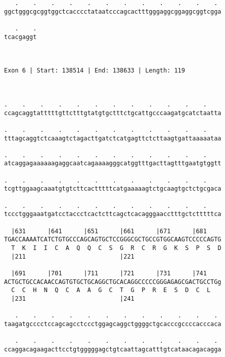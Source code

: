 \documentclass{article}
\begin{document}
\begin{Verbatim}
   .    .    .    .    .    .    .    .    .    .    .    . 
ggctgggcgcggtggctcacccctataatcccagcactttgggaggcggaggcggtcgga
                                                            
   .    .
tcacgaggt
         
         
 
Exon 6 | Start: 138514 | End: 138633 | Length: 119



.    .    .    .    .    .    .    .    .    .    .    .    
ccagcaggtatttttgttctttgtatgtgctttctgcattgcccaagatgcatctaatta
                                                            
.    .    .    .    .    .    .    .    .    .    .    .    
tttagcaggtctcaaagtctagacttgatctcatgagttctcttaagtgattaaaaataa
                                                            
.    .    .    .    .    .    .    .    .    .    .    .    
atcaggagaaaaaagaggcaatcagaaaagggcatggtttgacttagtttgaatgtggtt
                                                            
.    .    .    .    .    .    .    .    .    .    .    .    
tcgttggaagcaaatgtgtcttcactttttcatgaaaaagtctgcaagtgctctgcgaca
                                                            
.    .    .    .    .    .    .    .    .    .    .    .    
tccctgggaaatgatcctaccctcactcttcagctcacagggaacctttgctctttttca
                                                            
  |631      |641      |651      |661      |671      |681    
TGACCAAAATCATCTGTGCCCAGCAGTGCTCCGGGCGCTGCCGTGGCAAGTCCCCCAGTG
  T  K  I  I  C  A  Q  Q  C  S  G  R  C  R  G  K  S  P  S  D
  |211                          |221                        
  
  |691      |701      |711      |721      |731      |741    
ACTGCTGCCACAACCAGTGTGCTGCAGGCTGCACAGGCCCCCGGGAGAGCGACTGCCTGg
  C  C  H  N  Q  C  A  A  G  C  T  G  P  R  E  S  D  C  L   
  |231                          |241                        
  
   .    .    .    .    .    .    .    .    .    .    .    . 
taagatgcccctccagcagcctccctggagcaggctggggctgcacccgccccacccaca
                                                            
   .    .    .    .    .    .    .    .    .    .    .    . 
ccaggacagaagacttcctgtgggggagctgtcaattagcatttgtcataacagacagga
                                                            

\end{Verbatim}
\end{document}
